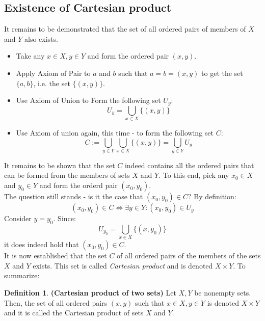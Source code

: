 \documentclass[12pt]{article}
\theoremstyle{plain}
\theoremstyle{definition}
\newtheorem{defn}[thm]{Definition}
\begin{document}
\subsection{Existence of Cartesian product}
It remains to be demonstrated that the set of all ordered pairs
of members of $X$ and $Y$ also exists.
\begin{itemize}
\item[1. ] Take any $x \in X, y \in Y$ and form the ordered pair $(x, y)$.
\item[2. ] Apply Axiom of Pair to $a$ and $b$ such that $a = b = (x, y)$ to get 
the set $\{a, b \}$, i.e. the set $ \{ (x, y) \}$.
\item[3. ] Use Axiom of Union to Form the following set $U_y$:
\begin{equation*}
U_y = \bigcup_{x \in X} \{ (x, y) \}
\end{equation*}
\item[4. ] Use Axiom of union again, this time - to form the following set $C$:
\begin{equation}
\label{definition_cartesian_product}
C := \bigcup_{y \in Y} \bigcup_{x \in X} \{ (x, y) \} = \bigcup_{y \in Y} U_y
\end{equation}
\end{itemize}
It remains to be shown that the set $C$ indeed contains all the ordered pairs that
can be formed from the members of sets $X$ and $Y$. To this end, pick any
$x_0 \in X$ and $y_0 \in Y$ and form the orderd pair $(x_0, y_0)$.
\\ \indent The question still stands - is it the case that $(x_0, y_0) \in C$? 
By definition:
\begin{equation*}
(x_0, y_0) \in C 
\Leftrightarrow 
\exists y \in Y: (x_0, y_0) \in U_y
\end{equation*}
Consider $y = y_0$. Since:
\begin{equation*}
U_{y_0} = \bigcup_{x \in X} \{ (x, y_0) \}
\end{equation*}
it does indeed hold that $(x_0, y_0) \in C$.
\\ \indent It is now established that the set $C$ of all ordered pairs of the members
of the sets $X$ and $Y$ exists. This set is called \textit{Cartesian product} and is
 denoted $X \times Y$. To summarize:
 
\begin{defn}
\textbf{(Cartesian product of two sets)} Let $X, Y$ be nonempty sets. Then, the set
of all ordered pairs $(x, y)$ such that $x \in X, y \in Y$ is denoted $X \times Y$ and 
it is called the Cartesian product of sets $X$ and $Y$.
\end{defn} 
\end{document}
